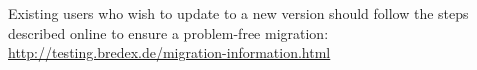 Existing users who wish to update to a new version should follow the steps described online to ensure a problem-free migration:\\
\url{http://testing.bredex.de/migration-information.html}

